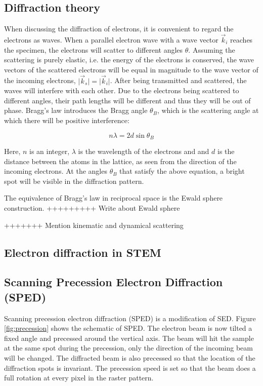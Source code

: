 	\subsection{Diffraction theory}
When discussing the diffraction of electrons, it is convenient to regard the electrons as waves. When a parallel electron wave with a wave vector $\vec{k}_i$ reaches the specimen, the electrons will scatter to different angles $\theta$. Assuming the scattering is purely elastic, i.e. the energy of the electrons is conserved, the wave vectors of the scattered electrons will be equal in magnitude to the wave vector of the incoming electrons, $\vert \vec{k}_s \vert = \vert \vec{k}_i \vert$. After being transmitted and scattered, the waves will interfere with each other. Due to the electrons being scattered to different angles, their path lengths will be different and thus they will be out of phase. Bragg's law introduces the Bragg angle $\theta_B$, which is the scattering angle at which there will be positive interference:

\begin{equation}
\label{braggs law}
n\lambda = 2 d \sin \theta_B
\end{equation}

Here, $n$ is an integer, $\lambda$ is the wavelength of the electrons and and $d$ is the distance between the atoms in the lattice, as seen from the direction of the incoming electrons. At the angles $\theta_B$ that satisfy the above equation, a bright spot will be visible in the diffraction pattern.

The equivalence of Bragg's law in reciprocal space is the Ewald sphere construction. +++++++++ Write about Ewald sphere

+++++++ Mention kinematic and dynamical scattering


	\subsection{Electron diffraction in STEM}
	
	\subsection{Scanning Precession Electron Diffraction (SPED)}
Scanning precession electron diffraction (SPED) is a modification of SED. Figure \ref{fig:precession} shows the schematic of SPED. The electron beam is now tilted a fixed angle and precessed around the vertical axis. The beam will hit the sample at the same spot during the precession, only the direction of the incoming beam will be changed. The diffracted beam is also precessed so that the location of the diffraction spots is invariant. The precession speed is set so that the beam does a full rotation at every pixel in the raster pattern.


